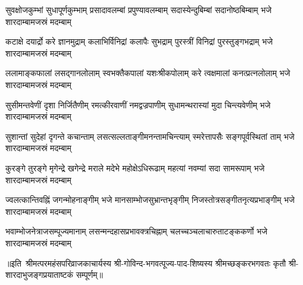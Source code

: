 

\fourlineindentedshloka
{सुवक्षोजकुम्भां सुधापूर्णकुम्भाम्}
{प्रसादावलम्बां प्रपुण्यावलम्बाम्}
{सदास्येन्दुबिम्बां सदानोष्ठबिम्बाम्}
{भजे शारदाम्बामजस्रं मदम्बाम्}

\fourlineindentedshloka
{कटाक्षे दयार्द्रो करे ज्ञानमुद्राम्}
{कलाभिर्विनिद्रां कलापैः सुभद्राम्}
{पुरस्त्रीं विनिद्रां पुरस्तुङ्गभद्राम्}
{भजे शारदाम्बामजस्रं मदम्बाम्}

\fourlineindentedshloka
{ललामाङ्कफालां लसद्गानलोलाम्}
{स्वभक्तैकपालां यशःश्रीकपोलाम्}
{करे त्वक्षमालां कनत्प्रत्नलोलाम्}
{भजे शारदाम्बामजस्रं मदम्बाम्}

\fourlineindentedshloka
{सुसीमन्तवेणीं दृशा निर्जितैणीम्}
{रमत्कीरवाणीं नमद्वज्रपाणीम्}
{सुधामन्थरास्यां मुदा चिन्त्यवेणीम्}
{भजे शारदाम्बामजस्रं मदम्बाम्}

\fourlineindentedshloka
{सुशान्तां सुदेहां दृगन्ते कचान्ताम्}
{लसत्सल्लताङ्गीमनन्तामचिन्त्याम्}
{स्मरेत्तापसैः सङ्गपूर्वस्थितां ताम्}
{भजे शारदाम्बामजस्रं मदम्बाम्}

\fourlineindentedshloka
{कुरङ्गे तुरङ्गे मृगेन्द्रे खगेन्द्रे}
{मराले मदेभे महोक्षेऽधिरूढाम्}
{महत्यां नवम्यां सदा सामरूपाम्}
{भजे शारदाम्बामजस्रं मदम्बाम्}

\fourlineindentedshloka
{ज्वलत्कान्तिवह्निं जगन्मोहनाङ्गीम्}
{भजे मानसाम्भोजसुभ्रान्तभृङ्गीम्}
{निजस्तोत्रसङ्गीतनृत्यप्रभाङ्गीम्}
{भजे शारदाम्बामजस्रं मदम्बाम्}

\fourlineindentedshloka
{भवाम्भोजनेत्राजसम्पूज्यमानाम्}
{लसन्मन्दहासप्रभावक्त्रचिह्नाम्}
{चलच्चञ्चलाचारुताटङ्ककर्णो}
{भजे शारदाम्बामजस्रं मदम्बाम्}

॥इति~श्रीमत्परमहंसपरिव्राजकाचार्यस्य श्री-गोविन्द-भगवत्पूज्य-पाद-शिष्यस्य 
श्रीमच्छङ्करभगवतः कृतौ श्री-शारदाभुजङ्गप्रयाताष्टकं सम्पूर्णम्॥